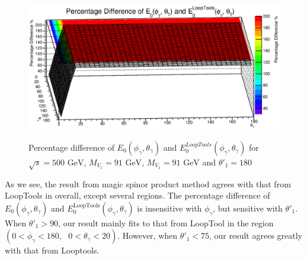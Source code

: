 \begin{figure}
	\begin{center}
		\includegraphics[scale=0.55]{180PD3.eps}\\
		\caption{ Percentage difference of $E_0(\phi_\gamma,\theta_\gamma)$ and $E_0^{LoopTools}(\phi_\gamma,\theta_\gamma)$ for $\sqrt{s}=500\text{ GeV}$, $M_{V_1}=91\text{ GeV}$, $M_{V_1}=91\text{ GeV}$ and $\theta'_1=180$ }
	\end{center}
\end{figure}

As we see, the result from magic spinor product method agrees with that from LoopTools in overall, except several regions. The percentage difference of $E_0(\phi_\gamma,\theta_\gamma)$ and $E_0^{\text{LoopTools}}(\phi_\gamma,\theta_\gamma)$ is insensitive with $\phi_\gamma$, but sensitive with $\theta'_1$. When $\theta'_1>90$, our result mainly fits to that from LoopTool in the region $(0<\phi_\gamma<180,\text{ }0<\theta_\gamma<20)$.
However, when $\theta'_1<75$, our result agrees greatly with that from Looptools.
